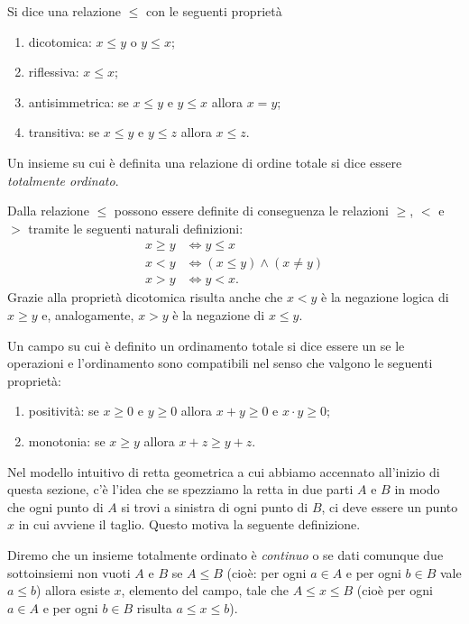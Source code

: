 \begin{definition}
\label{def:order}
Si dice 
una relazione $\le$ con le seguenti proprietà
\mymargin{$\le$}
\begin{enumerate}
\item dicotomica: $x \le y$ o $y \le x$;
\item riflessiva: $x \le x$;
\item antisimmetrica: se $ x\le y$ e $y \le x$ allora $x=y$;
\item transitiva: se $x\le y $ e $ y \le z$ allora $x\le z$.
\end{enumerate}
Un insieme su cui è definita una relazione di
ordine totale si dice essere \emph{totalmente ordinato}.
\end{definition}

Dalla relazione $\le$ possono essere definite di conseguenza
le relazioni $\ge$, $<$ e $>$ tramite le seguenti naturali definizioni:
\mymargin{$\ge$ $<$ $>$}%
\begin{align*}
  x \ge y &\iff y \le x \\
  x < y & \iff (x\le y) \land (x \neq y)\\
  x > y & \iff y< x.
\end{align*}
Grazie alla proprietà dicotomica risulta anche che
$x<y$ è la negazione logica di $x \ge y$ e, analogamente,
$x>y$ è la negazione di $x \le y$.

\begin{definition}
\label{def:campo_ordinato}%
Un campo su cui è definito un ordinamento totale
si dice essere un 
se le operazioni e l'ordinamento sono compatibili
nel senso che
valgono le seguenti proprietà:
\begin{enumerate}
\item positività: se $x\ge 0$ e $y \ge 0$ allora $x+y \ge 0$ e $x\cdot y\ge 0$;
\item monotonia: se $x \ge y$ allora $x+z \ge y+z$.
\end{enumerate}
\end{definition}

Nel modello intuitivo di retta geometrica a cui abbiamo accennato
all'inizio di questa sezione, c'è l'idea che se spezziamo la retta in due
parti $A$ e $B$ in modo che ogni punto di $A$ si trovi
a sinistra di ogni punto di $B$, ci deve essere un punto $x$ in
cui avviene il taglio. Questo motiva la seguente definizione.

\begin{definition}
\label{def:dedekind}
\mymark{***}
Diremo che un insieme totalmente ordinato è
\emph{continuo} o 
se
dati comunque due sottoinsiemi non vuoti $A$ e $B$ se $A \le B$
(cioè: per ogni $a \in A$ e per ogni $b\in B$ vale $a\le b$) allora esiste
$x$, elemento del campo, tale che $A\le x \le B$ (cioè per ogni $a\in A$ e per ogni $b\in B$
risulta $a\le x \le b$).
\end{definition}

